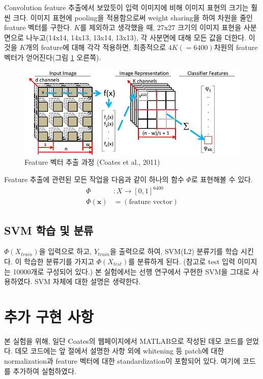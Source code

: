 \documentclass[a4paper,9pt,hidelinks]{article}
\begin{document}
\begin{multicols*}{2}
Convolution feature 추출에서 보았듯이 입력 이미지에 비해 이미지 표현의 크기는 훨씬 크다.
이미지 표현에 pooling을 적용함으로써 weight sharing을 하여 차원을 줄인 feature 벡터를 구한다.
$K$를 제외하고 생각했을 때, 27x27 크기의 이미지 표현을 사분면으로 나누고(14x14, 14x13, 13x14, 13x13), 각 사분면에 대해 모든 값을 더한다.
이것을 $K$개의 feature에 대해 각각 적용하면, 최종적으로 $4K(=6400)$차원의 feature 벡터가 얻어진다(그림 \ref{fig:feature_extraction} 오른쪽).

\begin{figure}[H]
\includegraphics[width=\linewidth]{feature_extraction}
\caption{Feature 벡터 추출 과정 (Coates et al., 2011)}
\label{fig:feature_extraction}
\end{figure}

Feature 추출에 관련된 모든 작업을 다음과 같이 하나의 함수 $\Phi$로 표현해볼 수 있다.
\begin{align*}
    \Phi &\colon X \to [0, 1]^{6400} \\
    \Phi(\mathbf{x}) &= (\text{feature vector})
\end{align*}

\subsection{SVM 학습 및 분류}

$\Phi(X_{train})$을 입력으로 하고, $Y_{train}$을 출력으로 하여, SVM(L2) 분류기를 학습 시킨다.
이 학습한 분류기를 가지고 $\Phi(X_{test})$를 분류하게 된다.
(참고로 test 입력 이미지는 10000개로 구성되어 있다.)
본 실험에서는 선행 연구에서 구현한 SVM을 그대로 사용하였다.
SVM 자체에 대한 설명은 생략한다.

\section{추가 구현 사항}

본 실험을 위해, 일단 Coates의 웹페이지에서 MATLAB으로 작성된 데모 코드를 얻었다.
데모 코드에는 앞 절에서 설명한 사항 외에 whitening 등 patch에 대한 normalization과 feature 벡터에 대한 standardization이 포함되어 있다.
여기에 코드를 추가하여 실험하였다.


\end{multicols*}
\end{document}
